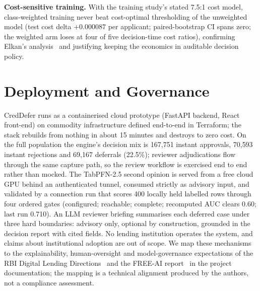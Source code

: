 \documentclass[conference]{IEEEtran}
\begin{document}
\textbf{Cost-sensitive training.} With the training study's stated 7.5:1
cost model, class-weighted training never beat cost-optimal thresholding of
the unweighted model (test cost delta $+0.000087$ per applicant;
paired-bootstrap CI spans zero; the weighted arm loses at four of five
decision-time cost ratios), confirming Elkan's analysis~\cite{elkan2001}
and justifying keeping the economics in auditable decision policy.

\section{Deployment and Governance}\label{sec:deploy}
CredDefer runs as a containerised cloud prototype (FastAPI backend, React
front-end) on commodity infrastructure defined end-to-end in Terraform; the
stack rebuilds from nothing in about 15 minutes and destroys to zero cost.
On the full population the engine's decision mix is 167{,}751 instant
approvals, 70{,}593 instant rejections and 69{,}167 deferrals (22.5\%);
reviewer adjudications flow through the same capture path, so the review
workflow is exercised end to end rather than mocked. The TabPFN-2.5 second
opinion is served from a free cloud GPU behind an authenticated tunnel,
consumed strictly as advisory input, and validated by a connection run that
scores 400 locally held labelled rows through four ordered gates
(configured; reachable; complete; recomputed AUC clears 0.60; last run
0.710). An LLM reviewer briefing summarises each deferred case under three
hard boundaries: advisory only, optional by construction, grounded in the
decision report with cited fields. No lending institution operates the
system, and claims about institutional adoption are out of scope. We map
these mechanisms to the explainability, human-oversight and
model-governance expectations of the RBI Digital Lending
Directions~\cite{rbi2025} and the FREE-AI report~\cite{rbifreeai} in the
project documentation; the mapping is a technical alignment produced by the
authors, not a compliance assessment.
\end{document}
